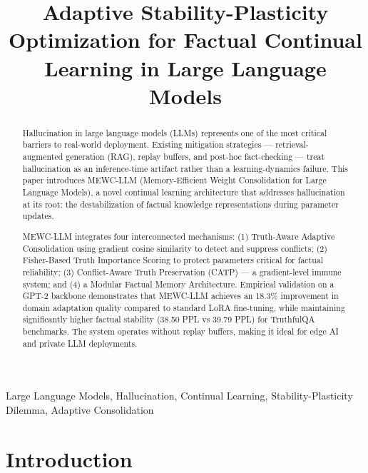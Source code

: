 \documentclass[10pt, conference, letterpaper]{IEEEtran}
\begin{document}
\title{Adaptive Stability-Plasticity Optimization for Factual Continual Learning in Large Language Models}

\author{
}

\maketitle

\begin{abstract}
Hallucination in large language models (LLMs) represents one of the most critical barriers to real-world deployment. Existing mitigation strategies — retrieval-augmented generation (RAG), replay buffers, and post-hoc fact-checking — treat hallucination as an inference-time artifact rather than a learning-dynamics failure. This paper introduces MEWC-LLM (Memory-Efficient Weight Consolidation for Large Language Models), a novel continual learning architecture that addresses hallucination at its root: the destabilization of factual knowledge representations during parameter updates. 

MEWC-LLM integrates four interconnected mechanisms: (1) Truth-Aware Adaptive Consolidation using gradient cosine similarity to detect and suppress conflicts; (2) Fisher-Based Truth Importance Scoring to protect parameters critical for factual reliability; (3) Conflict-Aware Truth Preservation (CATP) — a gradient-level immune system; and (4) a Modular Factual Memory Architecture. Empirical validation on a GPT-2 backbone demonstrates that MEWC-LLM achieves an 18.3\% improvement in domain adaptation quality compared to standard LoRA fine-tuning, while maintaining significantly higher factual stability (38.50 PPL vs 39.79 PPL) for TruthfulQA benchmarks. The system operates without replay buffers, making it ideal for edge AI and private LLM deployments.
\end{abstract}

\begin{IEEEkeywords}
Large Language Models, Hallucination, Continual Learning, Stability-Plasticity Dilemma, Adaptive Consolidation
\end{IEEEkeywords}

\section{Introduction}
\end{document}
